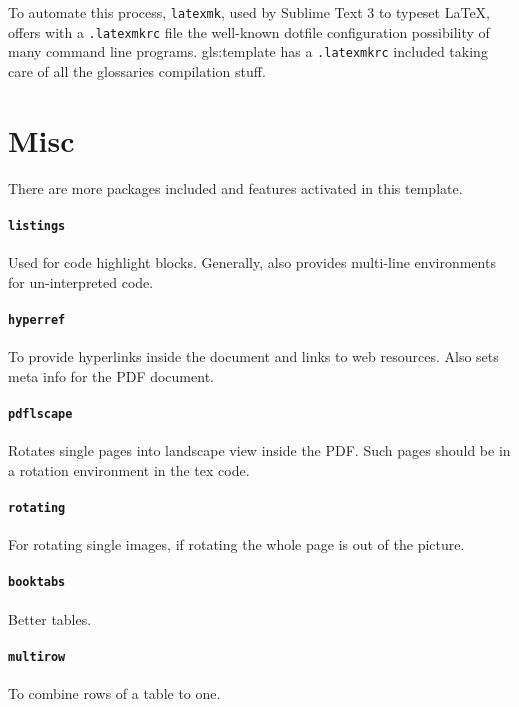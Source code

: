 To automate this process, \texttt{latexmk}, used by Sublime Text 3 to typeset \LaTeX, offers with a \texttt{.latexmkrc} file the well-known dotfile configuration possibility of many command line programs. \Gls{gls:template} has a \texttt{.latexmkrc} included taking care of all the glossaries compilation stuff.

\section{Misc} %
\label{sec:misc}
There are more packages included and features activated in this template.
\paragraph{\texttt{listings}} %
\label{par:listings}
Used for code highlight blocks. Generally, also provides multi-line environments for un-interpreted code.
\paragraph{\texttt{hyperref}} %
\label{par:hyperref}
To provide hyperlinks inside the document and links to web resources. Also sets meta info for the PDF document.
\paragraph{\texttt{pdflscape}} %
\label{par:pdflscape}
Rotates single pages into landscape view inside the PDF. Such pages should be in a rotation environment in the tex code.
\paragraph{\texttt{rotating}} %
\label{par:rotating}
For rotating single images, if rotating the whole page is out of the picture.
\paragraph{\texttt{booktabs}} %
\label{par:booktabs}
Better tables.
\paragraph{\texttt{multirow}} %
\label{par:multirow}
To combine rows of a table to one.
